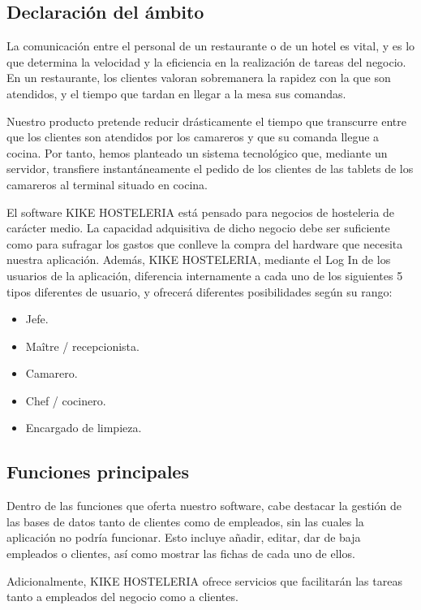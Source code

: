 \documentclass[spanish,a4paper,12pt]{report}	%
\begin{document}
		\subsection{Declaración del ámbito}
La comunicación entre el personal de un restaurante o de un hotel es vital, y es lo que determina la velocidad y la eficiencia en la realización de tareas del negocio. En un restaurante, los clientes valoran sobremanera la rapidez con la que son atendidos, y el tiempo que tardan en llegar a la mesa sus comandas. 

Nuestro producto pretende reducir drásticamente el tiempo que transcurre entre que los clientes son atendidos por los camareros y que su comanda llegue a cocina. Por tanto, hemos planteado un sistema tecnológico que, mediante un servidor, transfiere instantáneamente el pedido de los clientes de las tablets de los camareros al terminal situado en cocina.

El software KIKE HOSTELERIA está pensado para negocios de hosteleria de carácter medio. La capacidad adquisitiva de dicho negocio debe ser suficiente como para sufragar los gastos que conlleve la compra del hardware que necesita nuestra aplicación.
Además, KIKE HOSTELERIA, mediante el Log In de los usuarios de la aplicación, diferencia internamente a cada uno de los siguientes 5 tipos diferentes de usuario, y  ofrecerá diferentes posibilidades según su rango:
	\begin{itemize}
		\item  Jefe.
		\item Maître / recepcionista.
		\item Camarero.
		\item Chef / cocinero.
		\item  Encargado de limpieza.
	\end {itemize}


		\subsection{Funciones principales} 

Dentro de las funciones  que oferta nuestro software, cabe destacar la gestión de las bases de datos tanto de clientes como de empleados, sin las cuales la aplicación no podría funcionar. Esto incluye añadir, editar, dar de baja empleados o clientes, así como mostrar las fichas de cada uno de ellos.

Adicionalmente, KIKE HOSTELERIA ofrece servicios que facilitarán las tareas tanto a empleados del negocio como a clientes. 
\end{document}
